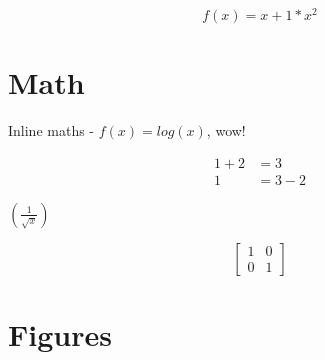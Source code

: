 \documentclass{article}
\begin{document}
\begin{equation*}
f(x) = x + 1 * x^2
\end{equation*}

\section{Math}
Inline maths - $f(x) = log(x)$, wow!

\begin{align*}
1 + 2 &= 3\\
1 &= 3 - 2
\end{align*}

$\left(\frac{1}{\sqrt{x}}\right)$

\begin{equation*}
\left[
\begin{matrix}
1 & 0\\
0 & 1
\end{matrix}
\right]
\end{equation*}

\section{Figures}
\end{document}
